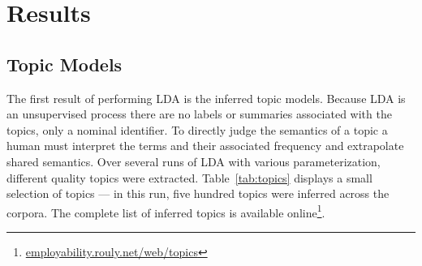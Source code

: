 \section{Results}

\subsection{Topic Models}

The first result of performing LDA is the inferred topic models.
Because LDA is an unsupervised process there are no labels or summaries associated with the topics, only a nominal identifier.
To directly judge the semantics of a topic a human must interpret the terms and their associated frequency and extrapolate shared semantics.
Over several runs of LDA with various parameterization, different quality topics were extracted.
Table~\ref{tab:topics} displays a small selection of topics --- in this run, five hundred topics were inferred across the corpora.
The complete list of inferred topics is available online\footnote{\href{http://employability.rouly.net/web/topics}{employability.rouly.net/web/topics}}.

